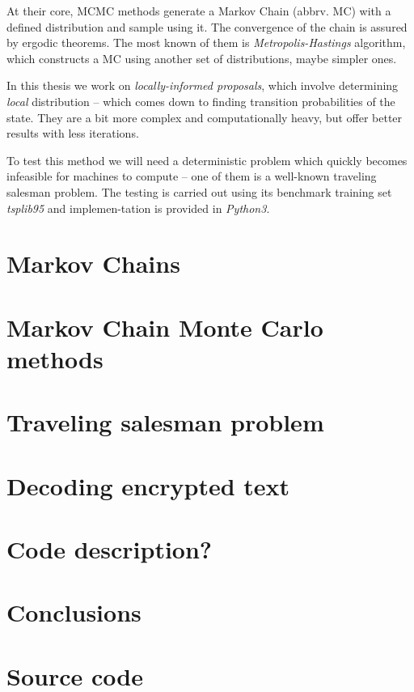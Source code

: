 \documentclass[a4paper, 12pt]{article}
\numberwithin{equation}{subsection}
\begin{document}
		At their core, MCMC methods generate a Markov Chain (abbrv. MC) with a defined distribution and sample using it. The convergence of the chain is assured by ergodic theorems. The most known of them is \textit{Metropolis-Hastings} algorithm, which constructs a MC using another set of distributions, maybe simpler ones.
		
		In this thesis we work on \textit{locally-informed proposals}, which involve determining \textit{local} distribution -- which comes down to finding transition probabilities of the state. They are a bit more complex and computationally heavy, but offer better results with less iterations. 
		
		To test this method we will need a deterministic problem which quickly becomes infeasible for machines to compute -- one of them is a well-known traveling salesman problem. The testing is carried out using its benchmark training set \textit{tsplib95} and implemen-tation is provided in \textit{Python3}.
	
	\section{Markov Chains}
	
	\section{Markov Chain Monte Carlo methods}
	
	\section{Traveling salesman problem}
	
	\section{Decoding encrypted text}
	
	\section{Code description?}
	
	\section{Conclusions}
	
	\clearpage
	\nocite{*}
	
	
	
	
	
	\appendix
	\clearpage
	\section{Source code} \label{apsec:code}
	\clearpage
	
	
\end{document}
